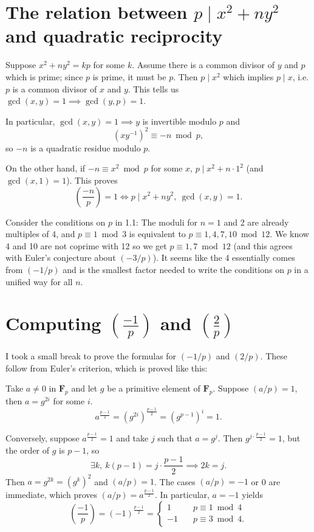 \documentclass[b5paper,12pt,oneside,openright]{memoir}
\newcommand{\jacobi}[2]{\left(\frac{#1}{#2}\right)}
\begin{document}
\section{The relation between $p\mid x^2+ny^2$ and quadratic reciprocity}
Suppose $x^2 + ny^2 = kp$ for some $k$. Assume there is a common divisor of $y$ and $p$ which is prime; since $p$ is prime, it must be $p$.
Then $p\mid x^2$ which implies $p\mid x$, i.e. $p$ is a common divisor of $x$ and $y$.
This tells us $\gcd(x,y)=1 \implies \gcd(y,p)=1$.

In particular, $\gcd(x,y)=1\implies y$ is invertible modulo $p$ and
\[(xy^{-1})^2\equiv -n\bmod p,\]
so $-n$ is a quadratic residue modulo $p$.

On the other hand, if $-n\equiv x^2\bmod p$ for some $x$, $p \mid x^2+n\cdot 1^2$ (and $\gcd(x,1)=1$). This proves
\[\jacobi{-n}{p}=1 \iff p\mid x^2+ny^2,\ \gcd(x,y)=1.\]

Consider the conditions on $p$ in 1.1: The moduli for $n=1$ and 2 are already multiples of 4, and $p\equiv1\bmod 3$ is equivalent to $p\equiv 1, 4, 7, 10\bmod 12$. We know 4 and 10 are not coprime with 12 so we get $p\equiv 1, 7\bmod 12$ (and this agrees with Euler's conjecture about $(-3/p)$). It seems like the 4 essentially comes from $(-1/p)$ and is the smallest factor needed to write the conditions on $p$ in a unified way for all $n$.

\section{Computing $\jacobi{-1}{p}$ and $\jacobi{2}{p}$}

I took a small break to prove the formulas for $(-1/p)$ and $(2/p)$. These follow from Euler's criterion, which is proved like this:

Take $a \neq 0$ in $\mathbf{F}_p$ and let $g$ be a primitive element of $\mathbf{F}_p$. Suppose $(a/p) = 1$, then $a = g^{2i}$ for some $i$.
\[a^\frac{p-1}{2} = (g^{2i})^\frac{p-1}{2} = (g^{p-1})^i = 1.\]

Conversely, suppose $a^\frac{p-1}{2} = 1$ and take $j$ such that $a = g^j$. Then $g^{j\cdot\frac{p-1}{2}} = 1$, but the order of $g$ is $p-1$, so
\[\exists k,\ k(p-1)=j\cdot\frac{p-1}{2}\implies 2k=j.\]
Then $a = g^{2k} = (g^k)^2$ and $(a/p) = 1$. The cases $(a/p) = -1$ or 0 are immediate, which proves $(a/p) = a^\frac{p-1}{2}$. In particular, $a=-1$ yields
\[\jacobi{-1}{p} = (-1)^\frac{p-1}{2} =
  \begin{cases}
     1 &\quad p\equiv 1\bmod 4\\
    -1 &\quad p\equiv 3\bmod 4.
  \end{cases}
\]
\end{document}
